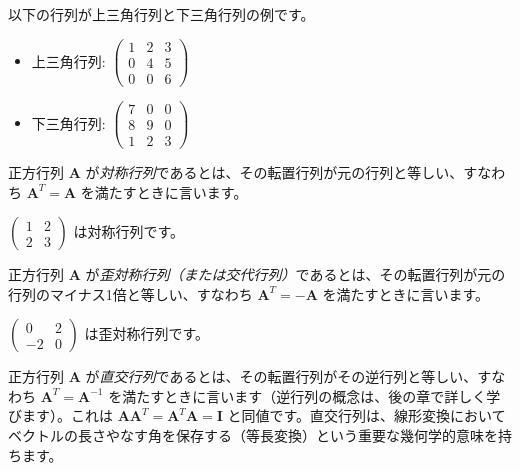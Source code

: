 \begin{ex}
以下の行列が上三角行列と下三角行列の例です。
\begin{itemize}
\item 上三角行列: $\begin{pmatrix} 1 & 2 & 3 \\ 0 & 4 & 5 \\ 0 & 0 & 6 \end{pmatrix}$
\item 下三角行列: $\begin{pmatrix} 7 & 0 & 0 \\ 8 & 9 & 0 \\ 1 & 2 & 3 \end{pmatrix}$
\end{itemize}
\end{ex}

\begin{dfn}[対称行列] \label{symmetric_matrix}
正方行列 $\bm{A}$ が\emph{対称行列}であるとは、その転置行列が元の行列と等しい、すなわち $\bm{A}^T = \bm{A}$ を満たすときに言います。
\end{dfn}

\begin{ex}
$\begin{pmatrix} 1 & 2 \\ 2 & 3 \end{pmatrix}$ は対称行列です。
\end{ex}

\begin{dfn} \label{skew_symmetric_matrix}
正方行列 $\bm{A}$ が\emph{歪対称行列（または交代行列）}であるとは、その転置行列が元の行列のマイナス1倍と等しい、すなわち $\bm{A}^T = -\bm{A}$ を満たすときに言います。
\end{dfn}

\begin{ex}
$\begin{pmatrix} 0 & 2 \\ -2 & 0 \end{pmatrix}$ は歪対称行列です。
\end{ex}

\begin{dfn}[直交行列] \label{orthogonal_matrix}
正方行列 $\bm{A}$ が\emph{直交行列}であるとは、その転置行列がその逆行列と等しい、すなわち $\bm{A}^T = \bm{A}^{-1}$ を満たすときに言います（逆行列の概念は、後の章で詳しく学びます）。これは $\bm{A}\bm{A}^T = \bm{A}^T\bm{A} = \bm{I}$ と同値です。直交行列は、線形変換においてベクトルの長さやなす角を保存する（等長変換）という重要な幾何学的意味を持ちます。
\end{dfn}

